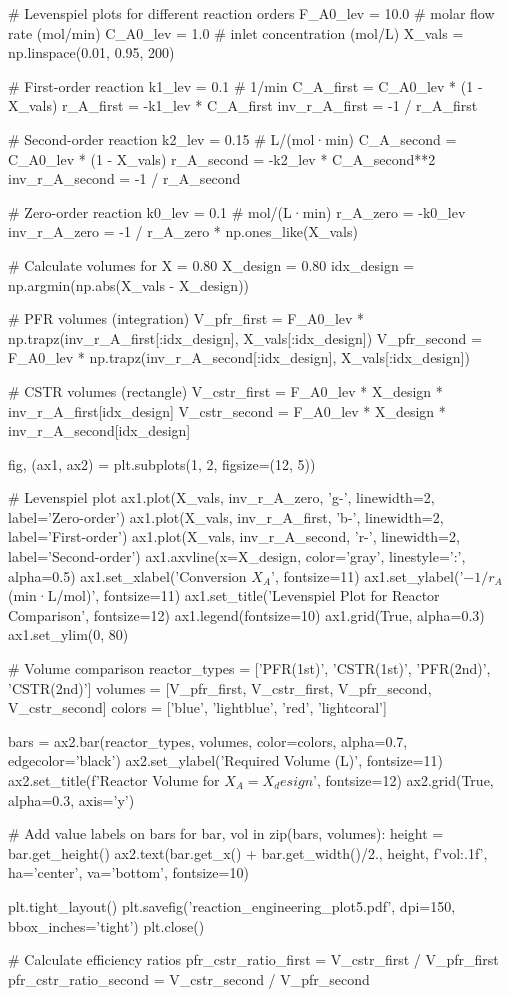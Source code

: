 \documentclass[11pt,a4paper]{article}
\begin{document}
\begin{pycode}
# Levenspiel plots for different reaction orders
F_A0_lev = 10.0  # molar flow rate (mol/min)
C_A0_lev = 1.0  # inlet concentration (mol/L)
X_vals = np.linspace(0.01, 0.95, 200)

# First-order reaction
k1_lev = 0.1  # 1/min
C_A_first = C_A0_lev * (1 - X_vals)
r_A_first = -k1_lev * C_A_first
inv_r_A_first = -1 / r_A_first

# Second-order reaction
k2_lev = 0.15  # L/(mol·min)
C_A_second = C_A0_lev * (1 - X_vals)
r_A_second = -k2_lev * C_A_second**2
inv_r_A_second = -1 / r_A_second

# Zero-order reaction
k0_lev = 0.1  # mol/(L·min)
r_A_zero = -k0_lev
inv_r_A_zero = -1 / r_A_zero * np.ones_like(X_vals)

# Calculate volumes for X = 0.80
X_design = 0.80
idx_design = np.argmin(np.abs(X_vals - X_design))

# PFR volumes (integration)
V_pfr_first = F_A0_lev * np.trapz(inv_r_A_first[:idx_design], X_vals[:idx_design])
V_pfr_second = F_A0_lev * np.trapz(inv_r_A_second[:idx_design], X_vals[:idx_design])

# CSTR volumes (rectangle)
V_cstr_first = F_A0_lev * X_design * inv_r_A_first[idx_design]
V_cstr_second = F_A0_lev * X_design * inv_r_A_second[idx_design]

fig, (ax1, ax2) = plt.subplots(1, 2, figsize=(12, 5))

# Levenspiel plot
ax1.plot(X_vals, inv_r_A_zero, 'g-', linewidth=2, label='Zero-order')
ax1.plot(X_vals, inv_r_A_first, 'b-', linewidth=2, label='First-order')
ax1.plot(X_vals, inv_r_A_second, 'r-', linewidth=2, label='Second-order')
ax1.axvline(x=X_design, color='gray', linestyle=':', alpha=0.5)
ax1.set_xlabel('Conversion $X_A$', fontsize=11)
ax1.set_ylabel('$-1/r_A$ (min·L/mol)', fontsize=11)
ax1.set_title('Levenspiel Plot for Reactor Comparison', fontsize=12)
ax1.legend(fontsize=10)
ax1.grid(True, alpha=0.3)
ax1.set_ylim(0, 80)

# Volume comparison
reactor_types = ['PFR\n(1st)', 'CSTR\n(1st)', 'PFR\n(2nd)', 'CSTR\n(2nd)']
volumes = [V_pfr_first, V_cstr_first, V_pfr_second, V_cstr_second]
colors = ['blue', 'lightblue', 'red', 'lightcoral']

bars = ax2.bar(reactor_types, volumes, color=colors, alpha=0.7, edgecolor='black')
ax2.set_ylabel('Required Volume (L)', fontsize=11)
ax2.set_title(f'Reactor Volume for $X_A = {X_design}$', fontsize=12)
ax2.grid(True, alpha=0.3, axis='y')

# Add value labels on bars
for bar, vol in zip(bars, volumes):
    height = bar.get_height()
    ax2.text(bar.get_x() + bar.get_width()/2., height,
            f'{vol:.1f}', ha='center', va='bottom', fontsize=10)

plt.tight_layout()
plt.savefig('reaction_engineering_plot5.pdf', dpi=150, bbox_inches='tight')
plt.close()

# Calculate efficiency ratios
pfr_cstr_ratio_first = V_cstr_first / V_pfr_first
pfr_cstr_ratio_second = V_cstr_second / V_pfr_second
\end{pycode}
\end{document}
